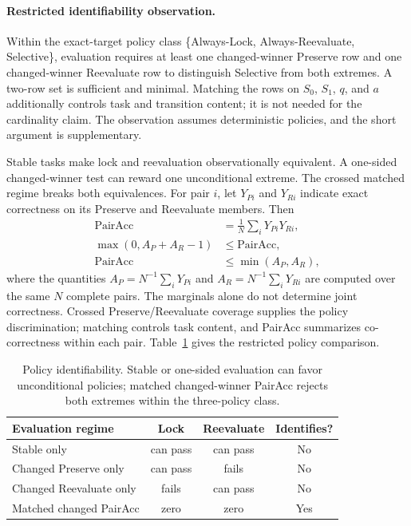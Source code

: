 \documentclass[letterpaper]{article}
\begin{document}
\paragraph{Restricted identifiability observation.}
Within the exact-target policy class \{Always-Lock, Always-Reevaluate, Selective\}, evaluation
requires at least one changed-winner Preserve row and one changed-winner Reevaluate row to
distinguish Selective from both extremes. A two-row set is sufficient and minimal. Matching the
rows on $S_0$, $S_1$, $q$, and $a$ additionally controls task and transition content; it is not
needed for the cardinality claim. The observation assumes deterministic policies, and the short
argument is supplementary.

Stable tasks make lock and reevaluation observationally equivalent. A one-sided changed-winner
test can reward one unconditional extreme. The crossed matched regime breaks both equivalences.
For pair $i$, let $Y_{Pi}$ and $Y_{Ri}$ indicate exact correctness on its Preserve and Reevaluate
members. Then
\begin{equation}
\begin{aligned}
\mathrm{PairAcc}&=\frac{1}{N}\sum_i Y_{Pi}Y_{Ri},\\
\max(0,A_P+A_R-1)&\leq\mathrm{PairAcc},\\
\mathrm{PairAcc}&\leq\min(A_P,A_R),
\end{aligned}
\end{equation}
where the quantities $A_P=N^{-1}\sum_iY_{Pi}$ and $A_R=N^{-1}\sum_iY_{Ri}$ are
computed over the same $N$ complete pairs. The marginals alone do not determine joint correctness. Crossed Preserve/Reevaluate
coverage supplies the policy discrimination; matching controls task content, and PairAcc
summarizes co-correctness within each pair.
Table~\ref{tab:policy-identifiability} gives the restricted policy comparison.

\begin{table}[t]
\centering
\small
\begin{tabular}{@{}lccc@{}}
\toprule
Evaluation regime & Lock & Reevaluate & Identifies? \\
\midrule
Stable only & can pass & can pass & No \\
Changed Preserve only & can pass & fails & No \\
Changed Reevaluate only & fails & can pass & No \\
Matched changed PairAcc & zero & zero & Yes \\
\bottomrule
\end{tabular}
\caption{Policy identifiability. Stable or one-sided evaluation can favor unconditional policies;
matched changed-winner PairAcc rejects both extremes within the three-policy class.}
\label{tab:policy-identifiability}
\end{table}
\end{document}
